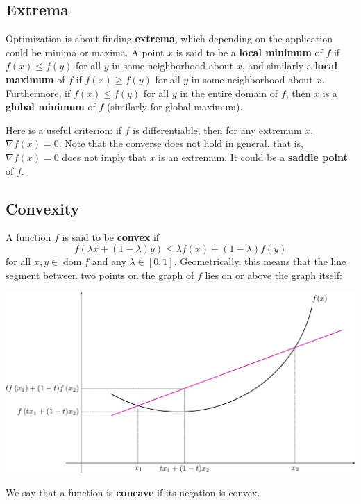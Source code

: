 \documentclass{article}
\DeclareMathOperator*{\dom}{dom}
\newcommand{\term}[1]{\textbf{#1}}
\begin{document}
\subsection{Extrema}
Optimization is about finding \term{extrema}, which depending on the application could be minima or maxima. A point $x$ is said to be a \term{local minimum} of $f$ if $f(x) \leq f(y)$ for all $y$ in some neighborhood about $x$, and similarly a \term{local maximum} of $f$ if $f(x) \geq f(y)$ for all $y$ in some neighborhood about $x$. Furthermore, if $f(x) \leq f(y)$ for all $y$ in the entire domain of $f$, then $x$ is a \term{global minimum} of $f$ (similarly for global maximum).

Here is a useful criterion: if $f$ is differentiable, then for any extremum $x$, $\nabla f(x) = 0$. Note that the converse does not hold in general, that is, $\nabla f(x) = 0$ does not imply that $x$ is an extremum. It could be a \term{saddle point} of $f$.

\subsection{Convexity}
A function $f$ is said to be \term{convex} if
\[f(\lambda x + (1-\lambda)y) \leq \lambda f(x) + (1-\lambda)f(y)\]
for all $x, y \in \dom f$ and any $\lambda \in [0,1]$. Geometrically, this means that the line segment between two points on the graph of $f$ lies on or above the graph itself:
\begin{center}
\includegraphics[width=0.9\linewidth]{convex}
\end{center}
We say that a function is \term{concave} if its negation is convex.
\end{document}
